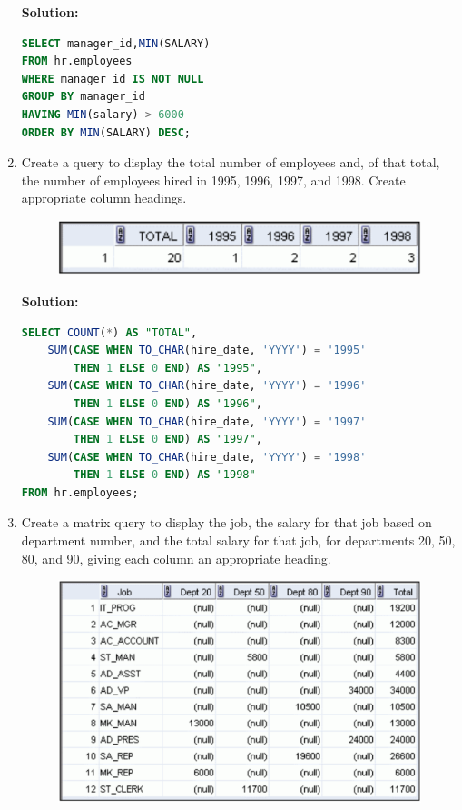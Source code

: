 \documentclass[a4paper,12pt]{article}
\begin{document}
\begin{enumerate}
    \textbf{Solution: }
    \begin{lstlisting}[language=SQL]
SELECT manager_id,MIN(SALARY)
FROM hr.employees
WHERE manager_id IS NOT NULL
GROUP BY manager_id
HAVING MIN(salary) > 6000
ORDER BY MIN(SALARY) DESC;
    \end{lstlisting}
    \newpage
    \item Create a query to display the total number of employees and, of that total, the number of
employees hired in 1995, 1996, 1997, and 1998. Create appropriate column headings.
    \begin{figure}[h]
        \centering
        \includegraphics[width=.5\linewidth]{graphics/610.png}
    \end{figure}

    \textbf{Solution: }
    \begin{lstlisting}[language=SQL]
SELECT COUNT(*) AS "TOTAL",
    SUM(CASE WHEN TO_CHAR(hire_date, 'YYYY') = '1995' 
        THEN 1 ELSE 0 END) AS "1995",
    SUM(CASE WHEN TO_CHAR(hire_date, 'YYYY') = '1996' 
        THEN 1 ELSE 0 END) AS "1996",
    SUM(CASE WHEN TO_CHAR(hire_date, 'YYYY') = '1997' 
        THEN 1 ELSE 0 END) AS "1997",
    SUM(CASE WHEN TO_CHAR(hire_date, 'YYYY') = '1998'
        THEN 1 ELSE 0 END) AS "1998"
FROM hr.employees;
    \end{lstlisting}
    \item Create a matrix query to display the job, the salary for that job based on department number,
and the total salary for that job, for departments 20, 50, 80, and 90, giving each column an
appropriate heading.
    \begin{figure}[h]
        \centering
        \includegraphics[width=.7\linewidth]{graphics/611.png}
    \end{figure}


\end{enumerate}
\end{document}
